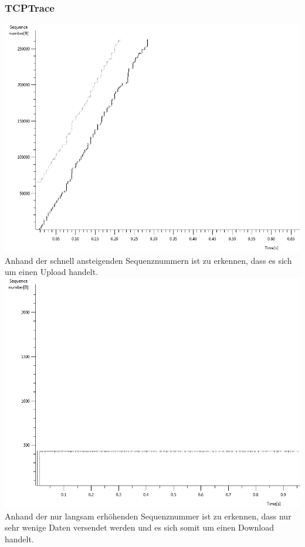 \subsubsection{TCPTrace}
\includegraphics[scale=0.5]{media/tcptraceUpload.png}\\
Anhand der schnell ansteigenden Sequenznummern ist zu erkennen, dass es sich um einen Upload handelt.\\
\includegraphics[scale=0.5]{media/tcptraceDownload.png}\\
Anhand der nur langsam erhöhenden Sequenznummer ist zu erkennen, dass nur sehr wenige Daten versendet werden und es sich somit um einen Download handelt.


